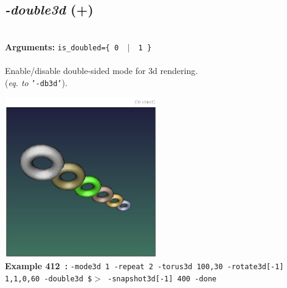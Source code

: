 \documentclass[a4paper,11pt,twoside]{book}
\begin{document}
\subsection{\emph{-double3d} (+)}\vspace*{-0.5em}
~\\\textbf{Arguments: } 
{\small \texttt{is\_doubled=\{ 0 ~$|$~ 1 \}}}\\~\\
Enable/disable double-sided mode for 3d rendering.
~\\(\emph{eq. to} {\small \texttt{'-db3d'}}).
\begin{center}\includegraphics[keepaspectratio=true,height=7cm,width=\textwidth]{img/gmic_def412.jpg}\\
{\footnotesize \textbf{Example 412~:} \texttt{-mode3d 1 -repeat 2 -torus3d 100,30 -rotate3d[-1] 1,1,0,60 -double3d \$$>$ -snapshot3d[-1] 400 -done}}
\end{center}
\end{document}
